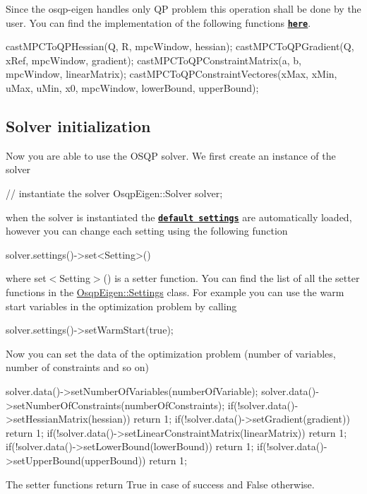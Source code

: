 Since the osqp-\/eigen handles only QP problem this operation shall be done by the user. You can find the implementation of the following functions \href{https://github.com/GiulioRomualdi/osqp-eigen/blob/master/example/src/MPCExample.cpp#L71-L182}{\tt {\bfseries here}}. 
\begin{DoxyCode}
castMPCToQPHessian(Q, R, mpcWindow, hessian);
castMPCToQPGradient(Q, xRef, mpcWindow, gradient);
castMPCToQPConstraintMatrix(a, b, mpcWindow, linearMatrix);
castMPCToQPConstraintVectores(xMax, xMin, uMax, uMin, x0, mpcWindow, lowerBound, upperBound);
\end{DoxyCode}
\hypertarget{index_OSQP_init}{}\subsection{Solver initialization}\label{index_OSQP_init}
Now you are able to use the O\+S\+QP solver. We first create an instance of the solver 
\begin{DoxyCode}
\textcolor{comment}{// instantiate the solver}
OsqpEigen::Solver solver;
\end{DoxyCode}
 when the solver is instantiated the \href{http://osqp.readthedocs.io/en/latest/interfaces/solver_settings.html}{\tt {\bfseries default settings}} are automatically loaded, however you can change each setting using the following function 
\begin{DoxyCode}
solver.settings()->set<Setting>()
\end{DoxyCode}
 where {\ttfamily set$<$\+Setting$>$()} is a setter function. You can find the list of all the setter functions in the {\ttfamily \hyperlink{classOsqpEigen_1_1Settings}{Osqp\+Eigen\+::\+Settings}} class. For example you can use the warm start variables in the optimization problem by calling 
\begin{DoxyCode}
solver.settings()->setWarmStart(\textcolor{keyword}{true});
\end{DoxyCode}


Now you can set the data of the optimization problem (number of variables, number of constraints and so on) 
\begin{DoxyCode}
solver.data()->setNumberOfVariables(numberOfVariable);
solver.data()->setNumberOfConstraints(numberOfConstraints);
\textcolor{keywordflow}{if}(!solver.data()->setHessianMatrix(hessian)) \textcolor{keywordflow}{return} 1;
\textcolor{keywordflow}{if}(!solver.data()->setGradient(gradient)) \textcolor{keywordflow}{return} 1;
\textcolor{keywordflow}{if}(!solver.data()->setLinearConstraintMatrix(linearMatrix)) \textcolor{keywordflow}{return} 1;
\textcolor{keywordflow}{if}(!solver.data()->setLowerBound(lowerBound)) \textcolor{keywordflow}{return} 1;
\textcolor{keywordflow}{if}(!solver.data()->setUpperBound(upperBound)) \textcolor{keywordflow}{return} 1;
\end{DoxyCode}
 The setter functions return {\ttfamily True} in case of success and {\ttfamily False} otherwise.


